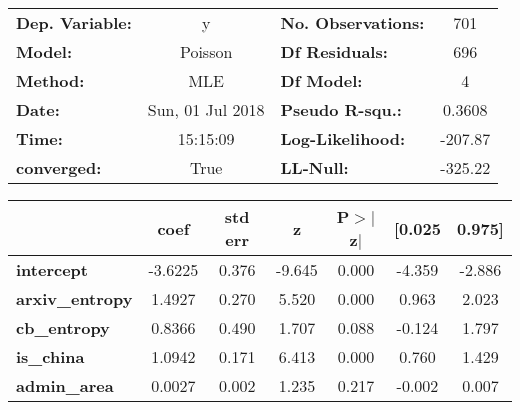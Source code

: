 \documentclass{report}
\begin{document}
\begin{center}
\begin{tabular}{lclc}
\toprule
\textbf{Dep. Variable:} &        y         & \textbf{  No. Observations:  } &      701    \\
\textbf{Model:}         &     Poisson      & \textbf{  Df Residuals:      } &      696    \\
\textbf{Method:}        &       MLE        & \textbf{  Df Model:          } &        4    \\
\textbf{Date:}          & Sun, 01 Jul 2018 & \textbf{  Pseudo R-squ.:     } &   0.3608    \\
\textbf{Time:}          &     15:15:09     & \textbf{  Log-Likelihood:    } &   -207.87   \\
\textbf{converged:}     &       True       & \textbf{  LL-Null:           } &   -325.22   \\
\bottomrule
\end{tabular}
\begin{tabular}{lcccccc}
                        & \textbf{coef} & \textbf{std err} & \textbf{z} & \textbf{P$>$$|$z$|$} & \textbf{[0.025} & \textbf{0.975]}  \\
\midrule
\textbf{intercept}      &      -3.6225  &        0.376     &    -9.645  &         0.000        &       -4.359    &       -2.886     \\
\textbf{arxiv\_entropy} &       1.4927  &        0.270     &     5.520  &         0.000        &        0.963    &        2.023     \\
\textbf{cb\_entropy}    &       0.8366  &        0.490     &     1.707  &         0.088        &       -0.124    &        1.797     \\
\textbf{is\_china}      &       1.0942  &        0.171     &     6.413  &         0.000        &        0.760    &        1.429     \\
\textbf{admin\_area}    &       0.0027  &        0.002     &     1.235  &         0.217        &       -0.002    &        0.007     \\
\bottomrule
\end{tabular}
\end{center}
\end{document}
